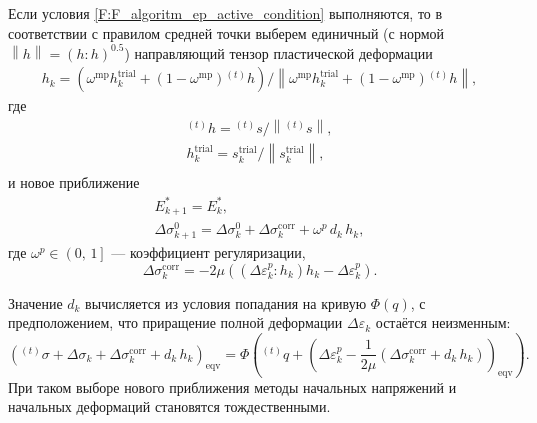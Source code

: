\begin{enumerate}
	Если условия \eqref{F:F_algoritm_ep_active_condition} выполняются, то в соответствии с правилом средней точки выберем единичный (с нормой $\left\|h\right\|=\left(h:h\right)^{0.5}$) направляющий тензор пластической деформации
	\begin{equation}
	\begin{gathered}
	h_{k}=\left( \omega^{\mathrm{mp}} h_{k}^{\mathrm{trial}}+\left(1-\omega^{\mathrm{mp}}\right) {}^{(t)}h\right) /
	\left\|\omega^{\mathrm{mp}} h_{k}^{\mathrm{trial}}+\left(1-\omega^{\mathrm{mp}}\right) {}^{(t)}h\right\|,
	\label{F:F_algoritm_ep_new_unit_normal1}
	\end{gathered}
	\end{equation}
	где
	\begin{equation}
	\begin{gathered}
	{}^{(t)}h={}^{(t)}s/\left\|{}^{(t)}s\right\|,\\
	h_{k}^{\mathrm{trial}}=s_{k}^{\mathrm{trial}}/\left\|s_{k}^{\mathrm{trial}}\right\|,\\
	\label{F:F_algoritm_ep_new_unit_normal2}
	\end{gathered}
	\end{equation}	
	и новое приближение
	\begin{equation}
	\begin{gathered}
	E_{k+1}^*=E_k^*,\\
	\Delta\sigma_{k+1}^0=\Delta\sigma_{k}^0+\Delta\sigma_{k}^{\mathrm{corr}}+\omega^{p}\,d_k\,h_{k},
	\label{F:F_algoritm_ep_new_active1}
	\end{gathered}
	\end{equation}
	где $\omega^{p}\in\left(0,\,1\right]$ --- коэффициент регуляризации,
	\begin{equation}
	\Delta\sigma_{k}^{\mathrm{corr}}=-2\mu\left(\left( \Delta\varepsilon_k^p:h_{k}\right)h_{k} -\Delta\varepsilon_k^p\right).
	\label{F:F_algoritm_ep_new_active2}
	\end{equation}
	
	Значение $d_k$ вычисляется из условия попадания на кривую $\Phi\left(q\right)$, с предположением, что приращение полной деформации $\Delta\varepsilon_k$ остаётся неизменным:
	\begin{equation}
	\left({}^{(t)}\sigma+\Delta\sigma_k+\Delta\sigma_{k}^{\mathrm{corr}}+d_k\,h_{k}\right)_{\mathrm{eqv}}=\Phi\left({}^{(t)}q+\left(\Delta\varepsilon_k^p-\frac{1}{2\mu}\left(\Delta\sigma_{k}^{\mathrm{corr}}+d_k\,h_{k}\right)  \right)_{\mathrm{eqv}} \right).
	\end{equation}
	При таком выборе нового приближения методы начальных напряжений и начальных деформаций становятся тождественными.
	

\end{enumerate}
